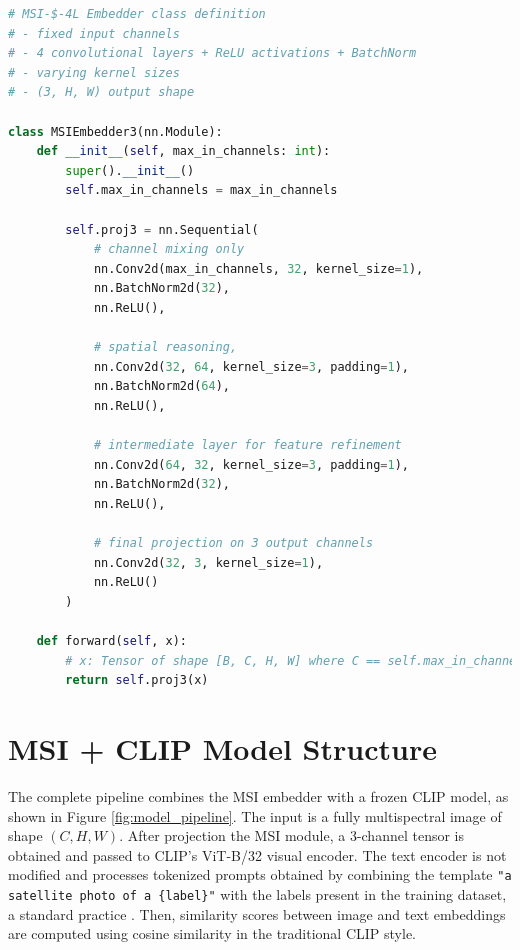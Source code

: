 \documentclass[a4paper, oneside, english]{sapthesis} %
\begin{document}
\begin{lstlisting}[language=Python, caption={MSI-T-4L Embedder structure in PyTorch code.}]
# MSI-$-4L Embedder class definition
# - fixed input channels
# - 4 convolutional layers + ReLU activations + BatchNorm
# - varying kernel sizes
# - (3, H, W) output shape

class MSIEmbedder3(nn.Module):
    def __init__(self, max_in_channels: int):
        super().__init__()
        self.max_in_channels = max_in_channels

        self.proj3 = nn.Sequential(
            # channel mixing only
            nn.Conv2d(max_in_channels, 32, kernel_size=1),  
            nn.BatchNorm2d(32),
            nn.ReLU(),
            
            # spatial reasoning,
            nn.Conv2d(32, 64, kernel_size=3, padding=1),
            nn.BatchNorm2d(64),
            nn.ReLU(),
            
            # intermediate layer for feature refinement
            nn.Conv2d(64, 32, kernel_size=3, padding=1), 
            nn.BatchNorm2d(32),
            nn.ReLU(),

            # final projection on 3 output channels
            nn.Conv2d(32, 3, kernel_size=1),                
            nn.ReLU()
        )

    def forward(self, x):
        # x: Tensor of shape [B, C, H, W] where C == self.max_in_channels
        return self.proj3(x)
\end{lstlisting}


\section{MSI + CLIP Model Structure}

The complete pipeline combines the MSI embedder with a frozen CLIP model, as shown in Figure \ref{fig:model_pipeline}. The input is a fully multispectral image of shape $(C, H, W)$. After projection  the MSI module, a 3-channel tensor is obtained and passed to CLIP’s ViT-B/32 visual encoder. The text encoder is not modified and processes tokenized prompts obtained by combining the template \texttt{"a satellite photo of a \{label\}"} with the labels present in the training dataset, a standard practice \cite{radford2021learning} \cite{liu2024remoteclip} \cite{zhang2024rs5m}. Then, similarity scores between image and text embeddings are computed using cosine similarity in the traditional CLIP style.
\end{document}
